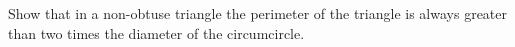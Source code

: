 Show that in a non-obtuse triangle the perimeter of the triangle is always greater than two times the diameter of the circumcircle.